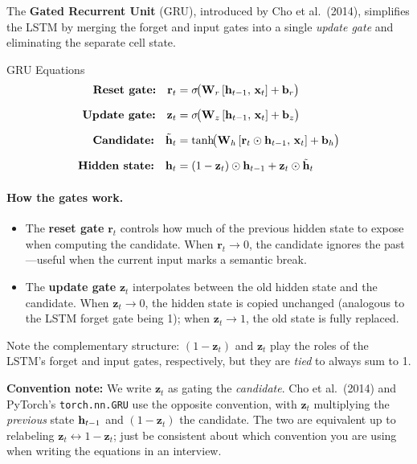 The \textbf{Gated Recurrent Unit} (GRU), introduced by Cho et al.\ (2014),
simplifies the LSTM by merging the forget and input gates into a single
\emph{update gate} and eliminating the separate cell state.

\begin{mathresult}{GRU Equations}
\begin{align}
\textbf{Reset gate:} \quad
\mathbf{r}_t &= \sigma\!\bigl(\mathbf{W}_r \,[\mathbf{h}_{t-1},\, \mathbf{x}_t] + \mathbf{b}_r\bigr)
\label{eq:gru_reset} \\[6pt]
\textbf{Update gate:} \quad
\mathbf{z}_t &= \sigma\!\bigl(\mathbf{W}_z \,[\mathbf{h}_{t-1},\, \mathbf{x}_t] + \mathbf{b}_z\bigr)
\label{eq:gru_update} \\[6pt]
\textbf{Candidate:} \quad
\tilde{\mathbf{h}}_t &= \tanh\!\bigl(\mathbf{W}_h \,[\mathbf{r}_t \odot \mathbf{h}_{t-1},\, \mathbf{x}_t]
                + \mathbf{b}_h\bigr)
\label{eq:gru_candidate} \\[6pt]
\textbf{Hidden state:} \quad
\mathbf{h}_t &= (1 - \mathbf{z}_t) \odot \mathbf{h}_{t-1}
       + \mathbf{z}_t \odot \tilde{\mathbf{h}}_t
\label{eq:gru_hidden}
\end{align}
\end{mathresult}

\paragraph{How the gates work.}
\begin{itemize}[leftmargin=*]
\item The \textbf{reset gate} $\mathbf{r}_t$ controls how much of the
  previous hidden state to expose when computing the candidate.  When
  $\mathbf{r}_t \to 0$, the candidate ignores the past---useful when the
  current input marks a semantic break.

\item The \textbf{update gate} $\mathbf{z}_t$ interpolates between the old
  hidden state and the candidate.  When $\mathbf{z}_t \to 0$, the hidden
  state is copied unchanged (analogous to the LSTM forget gate being 1);
  when $\mathbf{z}_t \to 1$, the old state is fully replaced.
\end{itemize}

Note the complementary structure: $(1 - \mathbf{z}_t)$ and $\mathbf{z}_t$
play the roles of the LSTM's forget and input gates, respectively, but they
are \emph{tied} to always sum to 1.

\textbf{Convention note:} We write $\mathbf{z}_t$ as gating the
\emph{candidate}.  Cho et al.\ (2014) and PyTorch's \texttt{torch.nn.GRU}
use the opposite convention, with $\mathbf{z}_t$ multiplying the
\emph{previous} state $\mathbf{h}_{t-1}$ and $(1 - \mathbf{z}_t)$ the candidate.
The two are equivalent up to relabeling
$\mathbf{z}_t \leftrightarrow 1 - \mathbf{z}_t$; just be consistent about
which convention you are using when writing the equations in an interview.


